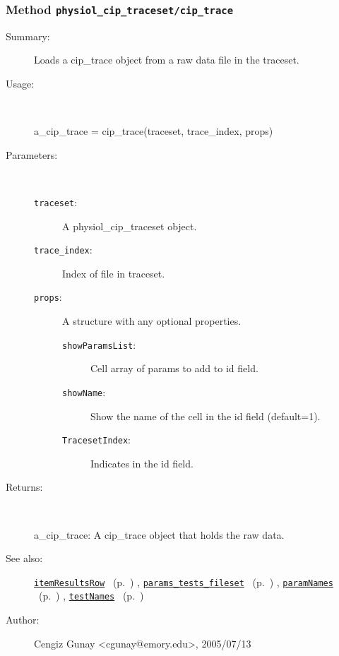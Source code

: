 \subsubsection[Method \texttt{cip\_trace}]{Method \texttt{physiol\_cip\_traceset/cip\_trace}}%
%
\label{ref_physiol_cip_traceset__cip_trace}%
\hypertarget{ref_physiol_cip_traceset__cip_trace}{}%
\begin{description}
\item[Summary:]Loads a cip\_trace object from a raw data file in the traceset.
%
\item[Usage:]~%
\begin{lyxcode}%
a\_cip\_trace = cip\_trace(traceset, trace\_index, props)
%
\end{lyxcode}%
%
%
\item[Parameters:]~
\begin{description}%
\item[\texttt{traceset}:]
 A physiol\_cip\_traceset object.
\item[\texttt{trace\_index}:]
 Index of file in traceset.
\item[\texttt{props}:]
 A structure with any optional properties.
\begin{description}%
\item[\texttt{showParamsList}:]
 Cell array of params to add to id field.
\item[\texttt{showName}:]
 Show the name of the cell in the id field (default=1).
\item[\texttt{TracesetIndex}:]
 Indicates in the id field.
\end{description}%
\end{description}%
%
\item[Returns:]~

	a\_cip\_trace: A cip\_trace object that holds the raw data.
%
%
\item[See also:]%
\hyperlink{ref_itemResultsRow}{\texttt{itemResultsRow}}%
\ (p.~\pageref{ref_itemResultsRow})%
%
, \hyperlink{ref_params_tests_fileset}{\texttt{params\_tests\_fileset}}%
\ (p.~\pageref{ref_params_tests_fileset})%
%
, \hyperlink{ref_paramNames}{\texttt{paramNames}}%
\ (p.~\pageref{ref_paramNames})%
%
, \hyperlink{ref_testNames}{\texttt{testNames}}%
\ (p.~\pageref{ref_testNames})%
%
%
\item[Author:]%
Cengiz Gunay <cgunay@emory.edu>, 2005/07/13%
\end{description}
\methodline%
